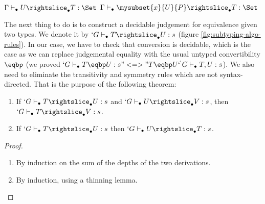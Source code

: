 \documentclass{llncs}
\renewcommand{\SubSubAs}[1][\Gamma]{%
\UAX{SubSub}
{$\subalgoimpl{#1}{c}{U}{T}{\Set}$}
{$\subalgoimpl{#1}{c[\eltpit~\ctxdot]}{\mysubset{x}{U}{P}}{T}{\Set}$}
{}
}
\begin{document}
\begin{paragraph}{}

\begin{figure*}
    \def\fCenter{\suba}
    \def\type{\typea}
    \def\sub{\suba}
    \begin{center}
    \SubConvA\DP 

    \vspace{\infvspace}
    \SubHnfA\DP

    \vspace{\infvspace}
    \SubProdA\DP

    \vspace{\infvspace}
    \SubSigmaA\DP

    \vspace{\infvspace}
    \SubProofA\DP

    \vspace{\infvspace}
    \SubSubAs\DP
  \end{center}
  \vspace{-2em}
  \caption{\Russell{} algorithmic equivalence}
  \label{fig:subtyping-algo-rules}
  \vspace{-1em}
\end{figure*}


\end{paragraph}
\begin{paragraph}{}
  The next thing to do is to construct a decidable judgement for
  equivalence given two types. We denote it by $`G \typea T
  \suba U : s$ (figure \ref{fig:subtyping-algo-rules}).
  In our case, we have to check that conversion is decidable, which is the
  case as we can replace judgemental equality with the usual untyped
  convertibility $\eqbp$ (we proved $`G \type T \eqbp U : s
  "<=>" T \eqbp U `^ `G \type T, U : s$).
  We also need to eliminate the transitivity and symmetry rules which are not
  syntax-directed. That is the purpose of the following theorem:
\begin{theorem}
  \begin{enumerate}
  \item If $`G \typea T \suba U : s$ and $`G \typea U \suba V : s$, then $`G \typea T
    \suba V : s$.
  \item If $`G \typea T \suba U : s$ then $`G \typea U \suba T : s$.
  \end{enumerate}
\end{theorem}
\begin{proof}
  \begin{enumerate}
  \item By induction on the sum of the depths of the two derivations.
  \item By induction, using a thinning lemma.
  \end{enumerate}
\end{proof}
\end{paragraph}
\end{document}
